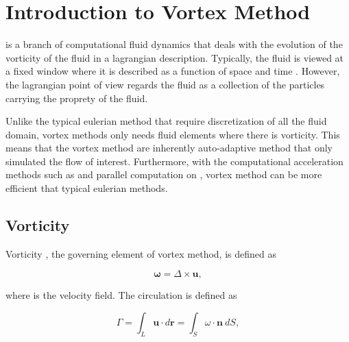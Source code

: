 \section{Introduction to Vortex Method}
 is a branch of computational fluid dynamics that deals with the evolution of the vorticity of the fluid in a lagrangian description. Typically, the fluid is viewed at a fixed window where it is described as a function of space  and time . However, the lagrangian point of view regards the fluid as a collection of the particles carrying the proprety of the fluid. 


Unlike the typical eulerian method that require discretization of all the fluid domain, vortex methods only needs fluid elements where there is vorticity. This means that the vortex method are inherently auto-adaptive method that only simulated the flow of interest. Furthermore, with the computational acceleration methods such as  and parallel computation on , vortex method can be more efficient that typical eulerian methods.

\subsection{Vorticity}
Vorticity , the governing element of vortex method, is defined as

\begin{equation}
\mathbf{\omega} = \Delta \times \mathbf{u},
\end{equation}

where  is the velocity field. The circulation  is defined as

\begin{equation}
\Gamma = \int_L\mathbf{u}\cdot d \mathbf{r}=\int_S\omega\cdot\mathbf{n}\ dS,
\end{equation}


